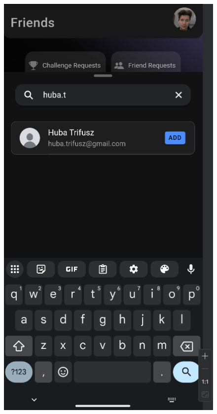 \documentclass[12pt]{report}
\begin{document}
\begin{figure}[H]
\begin{minipage}[b]{0.25\textwidth}
    \end{minipage}
    \hfill
    \begin{minipage}[b]{0.25\textwidth}
        \centering
        \includegraphics[width=\linewidth]{src/friends3.png}

    \end{minipage}


\end{figure}
\end{document}
